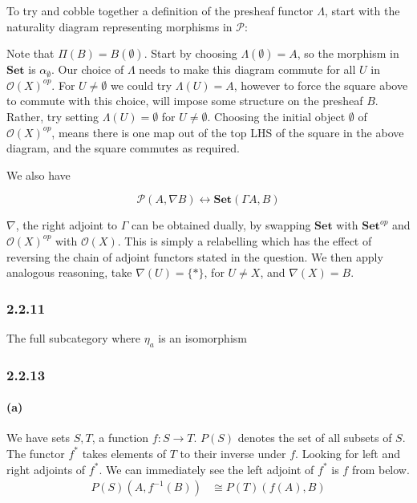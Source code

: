 \documentclass{article}
\begin{document}
To try and cobble together a definition of the presheaf functor $\Lambda$, start with the naturality diagram representing morphisms in $\mathcal{P}$:

\begin{center}
\end{center}

Note that $\Pi (B) = B(\emptyset)$. Start by choosing $\Lambda(\emptyset) = A$, so the morphism in $\mathbf{Set}$ is $\alpha_\emptyset$. Our choice of $\Lambda$ needs to make this diagram commute for all $U$ in $\mathcal{O}(X)^{op}$. For $U \neq \emptyset$ we could try $\Lambda(U) = A$, however to force the square above to commute with this choice, will impose some structure on the presheaf $B$. Rather, try setting  $\Lambda(U) = \emptyset$ for $U \neq \emptyset$. Choosing the initial object $\emptyset$ of $\mathcal{O}(X)^{op}$, means there is one map out of the top LHS of the square in the above diagram, and the square commutes as required.

We also have

\begin{equation*}
  \mathcal{P}(A, \nabla B) \leftrightarrow \mathbf{Set}(\Gamma A, B)
\end{equation*}

$\nabla$, the right adjoint to $\Gamma$ can be obtained dually, by swapping $\mathbf{Set}$ with $\mathbf{Set}^{op}$ and $\mathcal{O}(X)^{op}$ with $\mathcal{O}(X)$. This is simply a relabelling which has the effect of reversing the chain of adjoint functors stated in the question. We then apply analogous reasoning, take $\nabla(U) = \{*\}$, for $U \neq X$, and $\nabla(X) = B$.


\subsubsection*{2.2.11}
The full subcategory where $\eta_a$ is an isomorphism

\subsubsection*{2.2.13}
\paragraph{(a)}
We have sets $S, T$, a function $f\colon S \rightarrow T$. $P(S)$ denotes the set of all subsets of $S$. The functor $f^*$ takes elements of $T$ to their inverse under $f$. Looking for left and right adjoints of $f^*$. We can immediately see the left adjoint of $f^*$ is $f$ from below.
\begin{align}
\label{eqn:2213a1}
  P(S)(A,f^{-1}(B)) & \cong P(T)(f(A), B)
\end{align}
\end{document}
